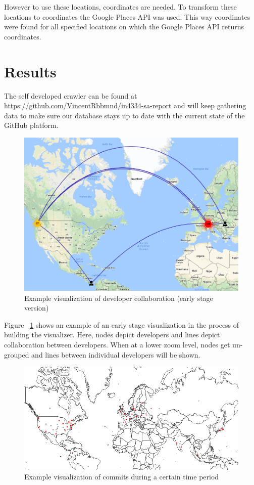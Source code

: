 \documentclass[acmtog, authorversion]{acmart}
\begin{document}
However to use these locations, coordinates are needed. 
To transform these locations to coordinates the Google Places API was used. 
This way coordinates were found for all specified locations on which the Google Places API returns coordinates.

\section{Results}
The self developed crawler can be found at \url{https://github.com/VincentRbbmnd/in4334-sa-report} and will keep gathering data to make sure our database stays up to date with the current state of the GitHub platform.

\begin{figure}
\includegraphics[scale=0.3]{images/visualizer-example.PNG} 
\caption{Example visualization of developer collaboration (early stage version)}
\label{fig:collaboration}
\end{figure}

Figure ~\ref{fig:collaboration} shows an example of an early stage visualization in the process of building the visualizer.
Here, nodes depict developers and lines depict collaboration between developers.
When at a lower zoom level, nodes get un-grouped and lines between individual developers will be shown.

\begin{figure}
\includegraphics[scale=0.4]{images/d3-example-rails.PNG} 
\caption{Example visualization of commits during a certain time period}
\label{fig:commits-period}
\end{figure}
\end{document}
